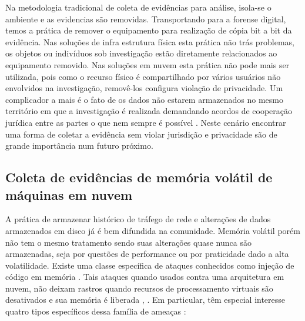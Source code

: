 Na metodologia tradicional de coleta de evidências para análise, isola-se o ambiente e as evidencias são removidas. Transportando para a forense digital, temos a prática de remover o equipamento para realização de cópia bit a bit da evidência.
%
Nas soluções de infra estrutura física esta prática não trás problemas, os objetos ou indivíduos sob investigação estão diretamente relacionados ao equipamento removido.
%
Nas soluções em nuvem esta prática não pode mais ser utilizada, pois como o recurso físico é compartilhado por vários usuários não envolvidos na investigação, removê-los configura violação de privacidade.
%
Um complicador a mais é o fato de os dados não estarem armazenados no mesmo território em que a investigação é realizada demandando acordos de cooperação jurídica entre as partes o que nem sempre é possível \cite{SimouCloudChlng:2014}.
%
Neste cenário encontrar uma forma de coletar a evidência sem violar jurisdição e privacidade são de grande importância num futuro próximo.


\subsection{Coleta de evidências de memória volátil de máquinas em nuvem}
\label{sec:forensenuvem}

A prática de armazenar histórico de tráfego de rede e alterações de dados armazenados em disco já é bem difundida na comunidade.
%
Memória volátil porém não tem o mesmo tratamento sendo suas alterações quase nunca são armazenadas, seja por questões de performance ou por praticidade dado a alta volatilidade.
%
Existe uma classe específica de ataques conhecidos como injeção de código em memória \cite{CaseMemoryForensics:2014}. Tais ataques quando usados contra uma arquitetura em nuvem, não deixam rastros quando recursos de processamento virtuais são desativados e sua memória é liberada \cite{VomelMemoryAcquisition:2013}, \cite{CaseMemoryForensics:2014}.
%
Em particular, têm especial interesse quatro tipos específicos dessa família de ameaças \cite{CaseMemoryForensics:2014}:


